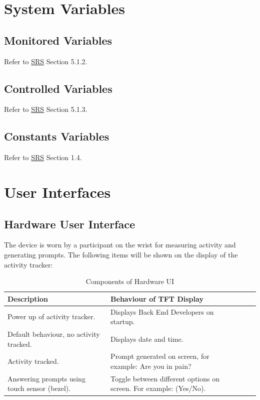 \documentclass[12pt, titlepage]{article}
\begin{document}
\section{System Variables}

\subsection{Monitored Variables}

Refer to \href{https://github.com/zakerl/Capstone_Project/blob/main/docs/SRS/SRS.pdf}{SRS} Section 5.1.2.
\subsection{Controlled Variables}

Refer to \href{https://github.com/zakerl/Capstone_Project/blob/main/docs/SRS/SRS.pdf}{SRS} Section 5.1.3.

\subsection{Constants Variables}

Refer to \href{https://github.com/zakerl/Capstone_Project/blob/main/docs/SRS/SRS.pdf}{SRS} Section 1.4.
\section{User Interfaces}


\subsection{Hardware User Interface}

The device is worn by a participant on the wrist for measuring activity and generating  prompts. The following items will be shown on the display of the activity tracker:
\begin{table}[H]
	\begin{tabularx}{1.05\textwidth} { 
		  | >{\centering\arraybackslash}X 
		  | >{\centering\arraybackslash}X 
		  | >{\centering\arraybackslash}X 
		  | >{\centering\arraybackslash}X | }
		 \hline
		 \textbf{Description} & \textbf{Behaviour of TFT Display} \\
		 \hline
		Power up of activity tracker. & Displays Back End Developers on startup.\\
		\hline
		 Default behaviour, no activity tracked.  & Displays date and time.\\
		 \hline
		   Activity tracked. & Prompt generated on screen, for example: Are you in pain?\\
		\hline 
		Answering prompts using touch sensor (bezel). & Toggle between different 				options on screen. For example: (Yes/No).\\
		\hline
	\end{tabularx}
\caption{\label{Hardware User Interface}Components of Hardware UI}  
\end{table}
\end{document}
